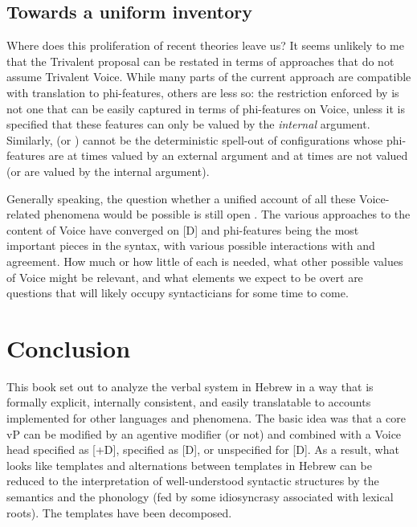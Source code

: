 \begin{exe}
\begin{xlist}
\begin{xlist}
\begin{xlist}
\begin{xlist}
\begin{xlist}
\begin{xlist}
\begin{exe}
\begin{xlist}
\begin{exe}
\begin{exe}
\begin{xlist}
\begin{exe}
\begin{exe}
\begin{xlist}
\begin{exe}
\begin{xlist}
\begin{exe}
\begin{xlist}
\begin{exe}
\begin{xlist}
\begin{exe}
\begin{xlist}
\begin{exe}
\begin{xlist}
\begin{exe}
\begin{xlist}
\begin{exe}
\begin{xlist}
\begin{exe}
\begin{xlist}
\begin{exe}
\begin{xlist}
\begin{exe}
\begin{xlist}
	\subsection{Towards a uniform inventory}
Where does this proliferation of recent theories leave us? It seems unlikely to me that the Trivalent proposal can be restated in terms of approaches that do not assume Trivalent Voice. While many parts of the current approach are compatible with translation to phi-features, others are less so: the restriction enforced by {\vz} is not one that can be easily captured in terms of phi-features on Voice, unless it is specified that these features can only be valued by the \emph{internal} argument. Similarly,  (or {\tkal}) cannot be the deterministic spell-out of configurations whose phi-features are at times valued by an external argument and at times are not valued (or are valued by the internal argument).

Generally speaking, the question whether a unified account of all these Voice-related phenomena would be possible is still open \citep[191fn12]{wurmbrandshimamura17}. The various approaches to the content of Voice have converged on [D] and phi-features being the most important pieces in the syntax, with various possible interactions with  and agreement. How much or how little of each is needed, what other possible values of Voice might be relevant, and what elements we expect to be overt are questions that will likely occupy syntacticians for some time to come.


\section{Conclusion} \label{i:conc}
This book set out to analyze the verbal system in Hebrew in a way that is formally explicit, internally consistent, and easily translatable to accounts implemented for other languages and phenomena. The basic idea was that a core vP can be modified by an agentive modifier (or not) and combined with a Voice head specified as [+D], specified as [\textminus{}D], or unspecified for [D]. As a result, what looks like templates and alternations between templates in Hebrew can be reduced to the interpretation of well-understood syntactic structures by the semantics and the phonology (fed by some idiosyncrasy associated with lexical roots). The templates have been decomposed.


\end{xlist}
\end{exe}
\end{xlist}
\end{exe}
\end{xlist}
\end{exe}
\end{xlist}
\end{exe}
\end{xlist}
\end{exe}
\end{xlist}
\end{exe}
\end{xlist}
\end{exe}
\end{xlist}
\end{exe}
\end{xlist}
\end{exe}
\end{xlist}
\end{exe}
\end{xlist}
\end{exe}
\end{exe}
\end{xlist}
\end{exe}
\end{exe}
\end{xlist}
\end{exe}
\end{xlist}
\end{xlist}
\end{xlist}
\end{xlist}
\end{xlist}
\end{xlist}
\end{exe}
